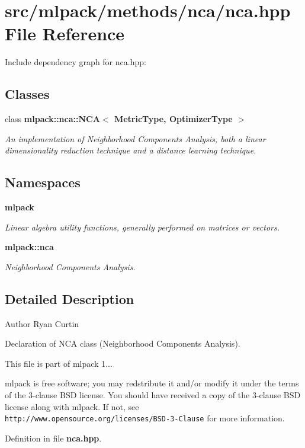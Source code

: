 \section{src/mlpack/methods/nca/nca.hpp File Reference}
\label{nca_8hpp}
Include dependency graph for nca.\-hpp\-:
\subsection*{Classes}
\begin{DoxyCompactItemize}
\item 
class {\bf mlpack\-::nca\-::\-N\-C\-A$<$ Metric\-Type, Optimizer\-Type $>$}
\begin{DoxyCompactList}\small\item\em An implementation of Neighborhood Components Analysis, both a linear dimensionality reduction technique and a distance learning technique. \end{DoxyCompactList}\end{DoxyCompactItemize}
\subsection*{Namespaces}
\begin{DoxyCompactItemize}
\item 
{\bf mlpack}
\begin{DoxyCompactList}\small\item\em Linear algebra utility functions, generally performed on matrices or vectors. \end{DoxyCompactList}\item 
{\bf mlpack\-::nca}
\begin{DoxyCompactList}\small\item\em Neighborhood Components Analysis. \end{DoxyCompactList}\end{DoxyCompactItemize}


\subsection{Detailed Description}
\begin{DoxyAuthor}{Author}
Ryan Curtin
\end{DoxyAuthor}
Declaration of N\-C\-A class (Neighborhood Components Analysis).

This file is part of mlpack 1...

mlpack is free software; you may redstribute it and/or modify it under the terms of the 3-\/clause B\-S\-D license. You should have received a copy of the 3-\/clause B\-S\-D license along with mlpack. If not, see {\tt http\-://www.\-opensource.\-org/licenses/\-B\-S\-D-\/3-\/\-Clause} for more information. 

Definition in file {\bf nca.\-hpp}.

